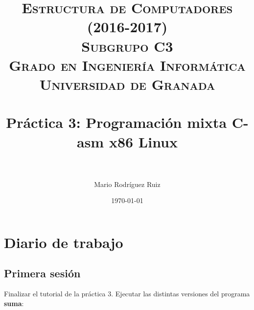 


\title{	
\normalfont \normalsize 
\textsc{\textbf{Estructura de Computadores (2016-2017)} \\ Subgrupo C3 \\ Grado en Ingeniería Informática\\ Universidad de Granada} \\ [25pt] %
\horrule{0.5pt} \\[0.4cm] %
\huge Práctica 3: Programación	mixta	C-asm	x86	Linux \\ %
\horrule{2pt} \\[0.5cm] %
}

\author{Mario Rodríguez Ruiz} %

\date{\normalsize\today} %




\maketitle %

\newpage %

\tableofcontents %

\listoffigures

\newpage

\section{Diario de trabajo}
\subsection {Primera sesión}
Finalizar el tutorial de la práctica 3. 
Ejecutar las distintas versiones del programa \textbf{suma}:

